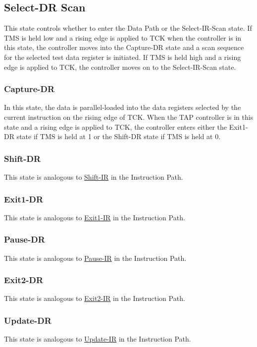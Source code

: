 \subsection{Select-DR Scan}
\label{subsec:select-dr}
This state controls whether to enter the Data Path or the Select-IR-Scan state. If TMS is held low and a rising edge is applied to TCK when the controller is in this state, the controller moves into the Capture-DR state and a scan sequence for the selected test data register is initiated. If TMS is held high and a rising edge is applied to TCK, the controller moves on to the Select-IR-Scan state.

\subsubsection{Capture-DR}
\label{subsubsec:capture-dr}
In this state, the data is parallel-loaded into the data registers selected by the current instruction on the rising edge of TCK. When the TAP controller is in this state and a rising edge is applied to TCK, the controller enters either the Exit1- DR state if TMS is held at 1 or the Shift-DR state if TMS is held at 0.

\subsubsection{Shift-DR}
\label{subsubsec:shift-dr}
This state is analogous to \hyperref[subsubsec:shift-ir]{Shift-IR} in the Instruction Path.

\subsubsection{Exit1-DR}
\label{subsubsec:exit1-dr}
This state is analogous to \hyperref[subsubsec:exit1-ir]{Exit1-IR} in the Instruction Path.

\subsubsection{Pause-DR}
\label{subsubsec:pause-dr}
This state is analogous to \hyperref[subsubsec:pause-ir]{Pause-IR} in the Instruction Path.

\subsubsection{Exit2-DR}
\label{subsubsec:exit2-dr}
This state is analogous to \hyperref[subsubsec:exit2-ir]{Exit2-IR} in the Instruction Path.

\subsubsection{Update-DR}
\label{subsubsec:update-dr}
This state is analogous to \hyperref[subsubsec:update-ir]{Update-IR} in the Instruction Path.